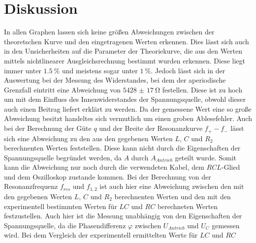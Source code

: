 \section{Diskussion}
\label{sec:Diskussion}

In allen Graphen lassen sich keine größen Abweichungen zwischen der theoretschen Kurve und den eingetragenen Werten erkennen. Dies lässt sich auch in den Unsicherheiten auf die Parameter der Theoriekurve, die aus den Werten mittels nichtlinearer Ausgleichsrechnung bestimmt wurden erkennen. Diese liegt immer unter $\SI{1.5}{\percent}$ und meistens sogar unter $\SI{1}{\percent}$. Jedoch lässt sich in der Auswertung bei der Messung des Widerstandes, bei dem der aperiodische Grenzfall eintritt eine Abweichung von $\SI{5428(17)}{\ohm}$ festellen. Diese ist zu hoch um mit dem Einfluss des Innenwiderstandes der Spannungsquelle, obwohl dieser auch einen Beitrag liefert erklärt zu werden. Da der gemessene Wert eine so große Abweichung besitzt handeltes sich vermutlich um einen groben Ablesefehler. Auch bei der Berechnung der Güte $q$ und der Breite der Resonanzkurve $f_+ - f_-$ lässt sich eine Abweichung zu den aus den gegebenen Werten $L$, $C$ und $R_2$ berechnenten Werten feststellen. Diese kann nicht durch die Eigenschaften der Spannungsquelle begründet werden, da $A$ durch $A_{Antrieb}$ geteilt wurde. Somit kann die Abweichung nur noch durch die verwendeten Kabel, dem $RCL$-Glied und dem Oszilloskop zustande kommen. Bei der Berechnung von der Resonanzfrequenz $f_{res}$ und $f_{1,2}$ ist auch hier eine Abweichung zwischen den mit den gegebenen Werten $L$, $C$ und $R_2$ berechnenten Werten und den mit den experimentell bestimmten Werten für $LC$ und $RC$ berechneten Werten festzustellen. Auch hier ist die Messung unabhängig von den Eigenschaften der Spannungsquelle, da die Phasendifferenz $\varphi$ zwischen $U_{Antrieb}$ und $U_C$ gemessen wird. Bei dem Vergleich der experimentell ermittelten Werte für $LC$ und $RC$ 







	
